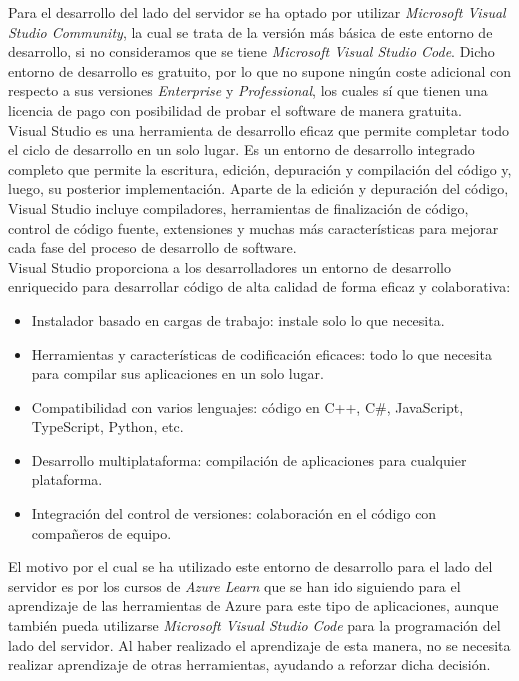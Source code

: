 Para el desarrollo del lado del servidor se ha optado por utilizar
\textit{Microsoft Visual Studio Community}, la cual se trata de la versión más
básica de este entorno de desarrollo, si no consideramos que se tiene \textit{Microsoft
Visual Studio Code}. Dicho entorno de desarrollo es gratuito, por lo que no
supone ningún coste adicional con respecto a sus versiones \textit{Enterprise} y
\textit{Professional}, los cuales sí que tienen una licencia de pago con
posibilidad de probar el software de manera gratuita.
\\
Visual Studio es una herramienta de desarrollo eficaz que permite completar todo
el ciclo de desarrollo en un solo lugar. Es un entorno de desarrollo integrado
 completo que permite la escritura, edición, depuración y compilación del
código y, luego, su posterior implementación. Aparte de la edición y depuración
del código, Visual Studio incluye compiladores, herramientas de finalización de
código, control de código fuente, extensiones y muchas más características para
mejorar cada fase del proceso de desarrollo de software. \\
Visual Studio proporciona a los desarrolladores un entorno de desarrollo
enriquecido para desarrollar código de alta calidad de forma eficaz y
colaborativa:\cite{vs2022Learn}
\begin{itemize}
    \item Instalador basado en cargas de trabajo: instale solo lo que necesita.
    \item Herramientas y características de codificación eficaces: todo lo que necesita
    para compilar sus aplicaciones en un solo lugar. 
    \item Compatibilidad con varios lenguajes: código en C++, C\#, JavaScript, TypeScript, Python, etc. 
    \item Desarrollo multiplataforma: compilación de aplicaciones para cualquier plataforma.
    \item Integración del control de versiones: colaboración en el código con compañeros de equipo.
\end{itemize}


El motivo por el cual se ha utilizado este entorno de desarrollo para el lado
del servidor es por los cursos de \textit{Azure Learn} que se han ido siguiendo
para el aprendizaje de las herramientas de Azure para este tipo de aplicaciones,
aunque también pueda utilizarse \textit{Microsoft Visual Studio Code} para la
programación del lado del servidor. Al haber realizado el aprendizaje de esta
manera, no se necesita realizar aprendizaje de otras herramientas, ayudando a
reforzar dicha decisión.\\


